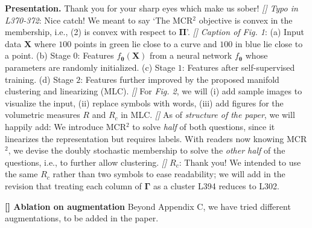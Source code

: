 \documentclass[10pt,twocolumn,letterpaper]{article}
\newcommand{\myparagraph}[1]{\noindent\textbf{#1}}
\newcommand{\myparagraphit}[1]{\noindent\textit{#1}}
\newcommand{\Rone}{{\color{blue}{R1}}}
\newcommand{\Rtwo}{{\color{blue}{R2}}}
\newcommand{\Rthree}{{\color{blue}{R3}}}
\begin{document}
\smallskip
\myparagraph{Presentation.} Thank you for your sharp eyes which make us sober! \myparagraphit{[\Rone]} \textit{Typo in L370-372}: Nice catch! We meant to say `The MCR$^2$ objective is convex in the membership, i.e., (2) is convex with respect to $\boldsymbol{\Pi}$'. \myparagraphit{[\Rtwo]} \textit{Caption of Fig. 1}: (a) Input data $\boldsymbol{X}$ where $100$ points in green lie close to a curve and $100$ in blue lie close to a point. (b) Stage $0$: Features $f_{\boldsymbol{\theta}}(\boldsymbol{X})$ from a neural network $f_{\boldsymbol{\theta}}$ whose parameters are randomly initialized. (c) Stage $1$: Features after self-supervised training. (d) Stage $2$: Features further improved by the proposed manifold clustering and linearizing (MLC). \myparagraphit{[\Rtwo]} For \textit{Fig. 2}, we will (i) add sample images to visualize the input, (ii) replace symbols with words, 
(iii) add figures for the volumetric measures $R$ and $R_c$ in MLC. \myparagraphit{[\Rtwo]} As of \textit{structure of the paper}, we will happily add: We introduce MCR$^2$ to solve \textit{half} of both questions, since it linearizes the representation but requires labels. With readers now knowing MCR$^2$, we devise the doubly stochastic membership to solve the \textit{other half} of the questions, i.e., to further allow clustering. \myparagraphit{[\Rthree]} $R_c$: Thank you! We intended to use the same $R_c$ rather than two symbols to ease readability; we will add in the revision that treating each column of $\mathbf{\Gamma}$ as a cluster L394 reduces to L302.

\smallskip
\myparagraph{[\Rtwo] Ablation on augmentation} Beyond Appendix C, we have tried different augmentations, to be added in the paper.
\end{document}
